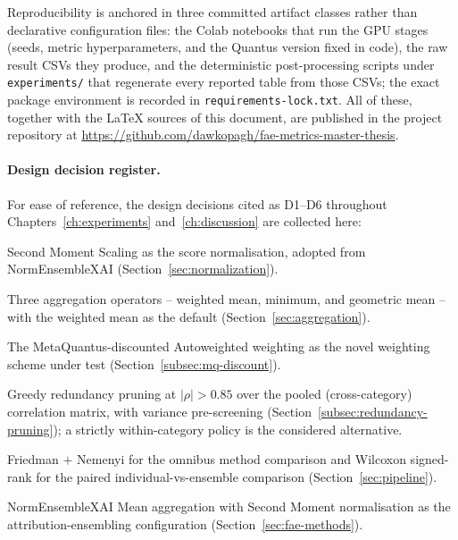 Reproducibility is anchored in three committed artifact classes rather
than declarative configuration files: the Colab notebooks that run the GPU
stages (seeds, metric hyperparameters, and the Quantus version fixed in
code), the raw result CSVs they produce, and the deterministic
post-processing scripts under \texttt{experiments/} that regenerate every
reported table from those CSVs; the exact package environment is recorded
in \texttt{requirements-lock.txt}. All of these, together with the \LaTeX{}
sources of this document, are published in the project repository at
\url{https://github.com/dawkopagh/fae-metrics-master-thesis}.

\paragraph{Design decision register.} For ease of reference, the design
decisions cited as D1--D6 throughout Chapters~\ref{ch:experiments}
and~\ref{ch:discussion} are collected here:

{\small
\renewcommand*\descriptionlabel[1]{\hspace\labelsep\normalfont\bfseries #1}
\begin{description}[leftmargin=2.6em, labelsep=0.5em, itemsep=1pt, parsep=0pt, topsep=3pt]
    \item[D1] Second Moment Scaling as the score normalisation, adopted from
    NormEnsembleXAI (Section~\ref{sec:normalization}).
    \item[D2] Three aggregation operators -- weighted mean, minimum, and
    geometric mean -- with the weighted mean as the default
    (Section~\ref{sec:aggregation}).
    \item[D3] The MetaQuantus-discounted Autoweighted weighting as the novel
    weighting scheme under test (Section~\ref{subsec:mq-discount}).
    \item[D4] Greedy redundancy pruning at $|\rho| > 0.85$ over the pooled
    (cross-category) correlation matrix, with variance pre-screening
    (Section~\ref{subsec:redundancy-pruning}); a strictly within-category
    policy is the considered alternative.
    \item[D5] Friedman $+$ Nemenyi for the omnibus method comparison and
    Wilcoxon signed-rank for the paired individual-vs-ensemble comparison
    (Section~\ref{sec:pipeline}).
    \item[D6] NormEnsembleXAI Mean aggregation with Second Moment
    normalisation as the attribution-ensembling configuration
    (Section~\ref{sec:fae-methods}).
\end{description}}
